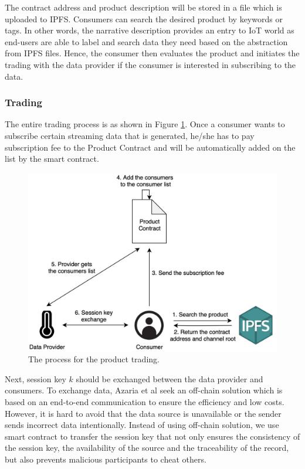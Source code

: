 \documentclass[journal,article,applsci,submit,moreauthors,pdftex]{Definitions/mdpi}
\begin{document}
The contract address and product description will be stored in a file which is uploaded to IPFS. Consumers can search the desired product by keywords or tags. In other words, the narrative description provides an entry to IoT world as end-users are able to label and search data they need based on the abstraction from IPFS files. Hence, the consumer then evaluates the product and initiates the trading with the data provider if the consumer is interested in subscribing to the data.

\subsubsection{Trading}
\label{section:trading}

The entire trading process is as shown in Figure \ref{fig:trading_product}. Once a consumer wants to subscribe certain streaming data that is generated, he/she has to pay subscription fee to the Product Contract and will be automatically added on the list by the smart contract.

\begin{figure}[H]
    \centering
    \includegraphics[width=3.3 in]{trading_product}
    \caption{The process for the product trading.}
    \label{fig:trading_product}
\end{figure}

Next, session key $k$ should be exchanged between the data provider and consumers. To exchange data, Azaria et al\cite{Medrec} seek an off-chain solution which is based on an end-to-end communication to ensure the efficiency and low costs. However, it is hard to avoid that the data source is unavailable or the sender sends incorrect data intentionally. Instead of using off-chain solution, we use smart contract to transfer the session key\cite{3tierDataMarket} that not only ensures the consistency of the session key, the availability of the source and the traceability of the record, but also prevents malicious participants to cheat others.
\end{document}
